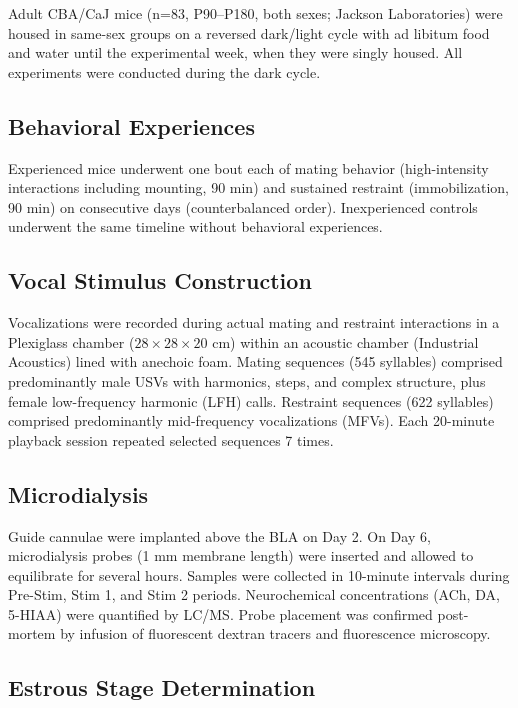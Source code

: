 \documentclass[11pt]{article}
\begin{document}
Adult CBA/CaJ mice (n=83, P90--P180, both sexes; Jackson Laboratories) were housed in same-sex groups on a reversed dark/light cycle with ad libitum food and water until the experimental week, when they were singly housed. All experiments were conducted during the dark cycle.

\subsection{Behavioral Experiences}

Experienced mice underwent one bout each of mating behavior (high-intensity interactions including mounting, 90 min) and sustained restraint (immobilization, 90 min) on consecutive days (counterbalanced order). Inexperienced controls underwent the same timeline without behavioral experiences.

\subsection{Vocal Stimulus Construction}

Vocalizations were recorded during actual mating and restraint interactions in a Plexiglass chamber ($28 \times 28 \times 20$ cm) within an acoustic chamber (Industrial Acoustics) lined with anechoic foam. Mating sequences (545 syllables) comprised predominantly male USVs with harmonics, steps, and complex structure, plus female low-frequency harmonic (LFH) calls. Restraint sequences (622 syllables) comprised predominantly mid-frequency vocalizations (MFVs). Each 20-minute playback session repeated selected sequences 7 times.

\subsection{Microdialysis}

Guide cannulae were implanted above the BLA on Day 2. On Day 6, microdialysis probes (1 mm membrane length) were inserted and allowed to equilibrate for several hours. Samples were collected in 10-minute intervals during Pre-Stim, Stim 1, and Stim 2 periods. Neurochemical concentrations (ACh, DA, 5-HIAA) were quantified by LC/MS. Probe placement was confirmed post-mortem by infusion of fluorescent dextran tracers and fluorescence microscopy.

\subsection{Estrous Stage Determination}
\end{document}

